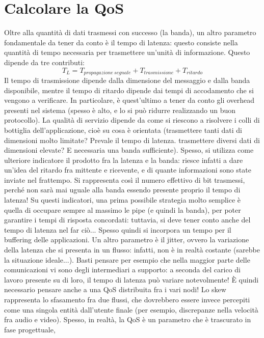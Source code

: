 \section{Calcolare la QoS}
Oltre alla quantità di dati trasmessi con successo (la banda), un altro
parametro fondamentale da tener da conto è il
tempo di latenza: questo consiste nella quantità di tempo necessaria per
trasmettere un'unità di informazione. Questo
dipende da tre contributi:
\begin{equation}
T_L = T_{propagazione\:segnale} + T_{trasmissione} + T_{ritardo}
\end{equation}
Il tempo di trasmissione dipende dalla dimensione del messaggio e dalla banda
disponibile, mentre il tempo di ritardo
dipende dai tempi di accodamento che si vengono a verificare. In particolare, è
quest'ultimo a tener da conto gli
overhead presenti nel sistema (spesso è alto, e lo si può ridurre realizzando un
buon protocollo).
La qualità di servizio dipende da come si riescono a risolvere i colli di
bottiglia dell'applicazione, cioè su cosa è
orientata (trasmettere tanti dati di dimensioni molto limitate? Prevale il tempo
di latenza. trasmettere diversi dati
di dimensioni elevate? E necessaria una banda sufficiente). Spesso, si utilizza
come ulteriore indicatore il prodotto
fra la latenza e la banda: riesce infatti a dare un'idea del ritardo fra
mittente e ricevente, e di quante informazioni
sono state inviate nel frattempo. Si rappresenta così il numero effettivo di bit
trasmessi, perché non sarà mai uguale
alla banda essendo presente proprio il tempo di latenza! Su questi indicatori,
una prima possibile strategia molto
semplice è quella di occupare sempre al massimo le pipe (e quindi la banda), per
poter garantire i tempi di risposta
concordati: tuttavia, si deve tener conto anche del tempo di latenza nel far
ciò... Spesso quindi si incorpora un
tempo per il buffering delle applicazioni. Un altro parametro è il jitter,
ovvero la variazione della latenza che si
presenta in un flusso: infatti, non è in realtà costante (sarebbe la situazione
ideale...).
Basti pensare per esempio che nella maggior parte delle comunicazioni vi sono
degli intermediari a supporto: a seconda
del carico di lavoro presente su di loro, il tempo di latenza può variare
notevolmente! È quindi necessario pensare
anche a una QoS distribuita fra i vari nodi!
Lo skew rappresenta lo sfasamento fra due flussi, che dovrebbero essere invece
percepiti come una singola entità
dall'utente finale (per esempio, discrepanze nella velocità fra audio e video).
Spesso, in realtà, la QoS è un parametro che è trascurato in fase progettuale,
